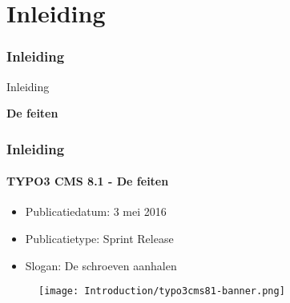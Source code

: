 %

\section{Inleiding}
\begin{frame}[fragile]
	\frametitle{Inleiding}

	\begin{center}\huge{Inleiding}\end{center}
	\begin{center}\huge{\color{typo3darkgrey}\textbf{De feiten}}\end{center}

\end{frame}

\begin{frame}[fragile]
	\frametitle{Inleiding}
	\framesubtitle{TYPO3 CMS 8.1 - De feiten}

	\begin{itemize}
		\item Publicatiedatum: 3 mei 2016
		\item Publicatietype: Sprint Release
		\item Slogan: De schroeven aanhalen
	\end{itemize}

	\begin{figure}
		\texttt{[image: Introduction/typo3cms81-banner.png]}
	\end{figure}

\end{frame}

